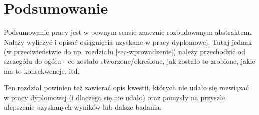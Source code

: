 \documentclass{amuthesis}
\begin{document}

\hypertarget{podsumowanie}{%
\chapter{Podsumowanie}\label{podsumowanie}}

Podsumowanie pracy jest w pewnym sensie znacznie rozbudowanym
abstraktem. Należy wyliczyć i opisać osiągnięcia uzyskane w pracy
dyplomowej. Tutaj jednak (w przeciwieństwie do np. rozdziału
\ref{sec-wprowadzenie}) należy przechodzić od szczegółu do ogółu - co
zostało stworzone/określone, jak zostało to zrobione, jakie ma to
konsekwencje, itd.

Ten rozdział powinien też zawierać opis kwestii, których nie udało się
rozwiązać w pracy dyplomowej (i dlaczego się nie udało) oraz pomysły na
przyszłe ulepszenie uzyskanych wyników lub dalsze badania.

\printbibliography[heading=bibintoc, title=Bibliografia]
\end{document}
